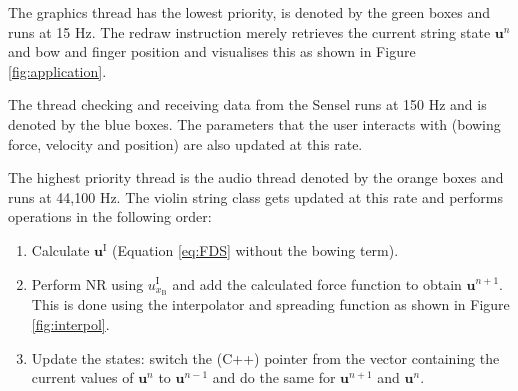 \documentclass[twoside,a4paper,dvipsnames]{article}
\begin{document}
The graphics thread has the lowest priority, is denoted by the green boxes and runs at 15 Hz. The redraw instruction merely retrieves the current string state $\mathbf{u}^n$ and bow and finger position and visualises this as shown in Figure \ref{fig:application}.

The thread checking and receiving data from the Sensel runs at 150 Hz and is denoted by the blue boxes. The parameters that the user interacts with (bowing force, velocity and position) are also updated at this rate.

The highest priority thread is the audio thread denoted by the orange boxes and runs at 44,100 Hz. The violin string class gets updated at this rate and performs operations in the following order:
\begin{enumerate}
    \item Calculate $\mathbf{u}^\text{I}$ (Equation \eqref{eq:FDS} without the bowing term). 
    \item Perform NR using $u^\text{I}_{x_\text{B}}$ and add the calculated force function to obtain $\mathbf{u}^{n+1}$. This is done using the interpolator and spreading function as shown in Figure \ref{fig:interpol}.
    \item Update the states: switch the (C++) pointer from the vector containing the current values of $\mathbf{u}^n$ to $\mathbf{u}^{n-1}$ and do the same for $\mathbf{u}^{n+1}$ and $\mathbf{u}^n$. 
\end{enumerate}
\end{document}

